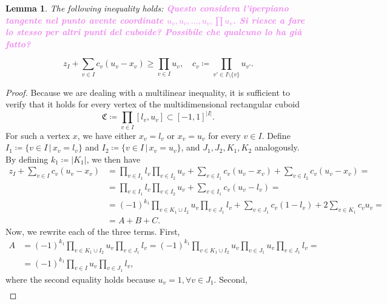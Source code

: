\documentclass{article}
\newtheorem{lemma}[theorem]{Lemma}
\begin{document}
	\begin{lemma}
		The following inequality holds:
		\textcolor{violet}{\textbf{Questo considera l'iperpiano tangente nel punto avente coordinate \(u_v, u_v, \ldots, u_v, \prod u_v\). Si riesce a fare lo stesso per altri punti del cuboide? Possibile che qualcuno lo ha già fatto?}}

		\begin{equation}
			z_I + \sum_{v \in I} c_v (u_v - x_v) \geq \prod_{v \in I} u_v, \quad c_v \coloneqq \prod_{v' \in I \setminus \{v\}}u_{v'}. \label{eq:ineq-lb}
		\end{equation}
		
	\end{lemma}
	\begin{proof}
		Because we are dealing with a multilinear inequality, it is sufficient to verify that it holds for every vertex of the multidimensional rectangular cuboid
		\begin{equation*}
			\mathfrak{C} \coloneqq \prod_{v \in I} [l_v, u_v] \subset [-1, 1]^{|I|}.
		\end{equation*} For such a vertex \(x\), we have either \(x_v = l_v\) or \(x_v = u_v\) for every \(v \in I\). Define \(I_1 \coloneqq \{v \in I \, | \, x_v = l_v\}\) and \(I_2 \coloneqq \{v \in I \, | \, x_v = u_v\}\), and \(J_1, J_2, K_1, K_2\) analogously. By defining \(k_1 \coloneqq |K_1| \), we then have
		\begin{align*}
			z_I + \sum_{v \in I} c_v (u_v - x_v) & = \prod_{v \in I_1} l_v \prod_{v \in I_2} u_v+ \sum_{v \in I_1} c_v (u_v - x_v) + \sum_{v \in I_2} c_v(u_v - x_v) = \\
			& =  \prod_{v \in I_1} l_v \prod_{v \in I_2} u_v+ \sum_{v \in I_1} c_v(u_v - l_v)= \\
			& =   (-1)^{k_1}\prod_{v \in K_1 \cup I_2}u_v \prod_{v \in J_1} l_v+ \sum_{v \in J_1} c_v(1 - l_v) + 2\sum_{v \in K_1}c_v u_v = \\
			& = A + B + C.
		\end{align*}
		Now, we rewrite each of the three terms. First,
		\begin{align*}
		A & = (-1)^{k_1}\prod_{v \in K_1 \cup I_2}u_v \prod_{v \in J_1} l_v = (-1)^{k_1}\prod_{v \in K_1 \cup I_2}u_v \prod_{v \in J_1}u_v \prod_{v \in J_1} l_v = \\
		& =  (-1)^{k_1}\prod_{v \in I}u_v \prod_{v \in J_1} l_v,
		\end{align*}
		where the second equality holds because \(u_v = 1, \forall v \in J_1\). Second,
		\begin{align*}

\end{align*}
\end{proof}
\end{document}
